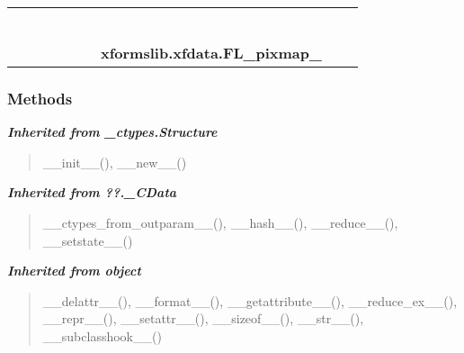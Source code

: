     \label{xformslib:xfdata:FL_pixmap_}
\begin{tabular}{cccccccccc}
\multicolumn{2}{r}{\settowidth{\BCL}{object}\multirow{2}{\BCL}{object}}
&&
&&
&&
  \\\cline{3-3}
  &&\multicolumn{1}{c|}{}
&&
&&
&&
  \\
\multicolumn{4}{r}{\settowidth{\BCL}{??.\_CData}\multirow{2}{\BCL}{??.\_CData}}
&&
&&
  \\\cline{5-5}
  &&&&\multicolumn{1}{c|}{}
&&
&&
  \\
\multicolumn{6}{r}{\settowidth{\BCL}{\_ctypes.Structure}\multirow{2}{\BCL}{\_ctypes.Structure}}
&&
  \\\cline{7-7}
  &&&&&&\multicolumn{1}{c|}{}
&&
  \\
&&&&&&\multicolumn{2}{l}{\textbf{xformslib.xfdata.FL\_pixmap\_}}
\end{tabular}



  \subsubsection{Methods}


\large{\textbf{\textit{Inherited from \_ctypes.Structure}}}

\begin{quote}
\_\_init\_\_(), \_\_new\_\_()
\end{quote}

\large{\textbf{\textit{Inherited from ??.\_CData}}}

\begin{quote}
\_\_ctypes\_from\_outparam\_\_(), \_\_hash\_\_(), \_\_reduce\_\_(), \_\_setstate\_\_()
\end{quote}

\large{\textbf{\textit{Inherited from object}}}

\begin{quote}
\_\_delattr\_\_(), \_\_format\_\_(), \_\_getattribute\_\_(), \_\_reduce\_ex\_\_(), \_\_repr\_\_(), \_\_setattr\_\_(), \_\_sizeof\_\_(), \_\_str\_\_(), \_\_subclasshook\_\_()
\end{quote}


